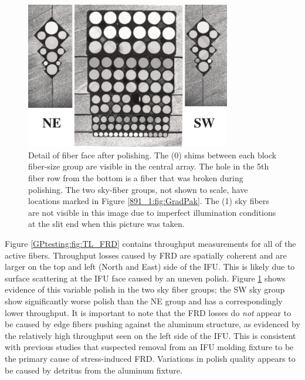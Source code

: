 \begin{figure}
  \centering
  \includegraphics[width=0.8\textwidth]{Appendix/figs/gradpak_facefig.pdf}
  \caption[\GP face and polishing
  detail]{\label{GPtesting:fig:gradpak_face}\fixspacing Detail of \GP
    fiber face
    after polishing. The  (0) shims between each
    block fiber-size group are visible in the central array. The hole
    in the 5th fiber row from the bottom is a fiber that was broken
    during polishing. The two sky-fiber groups, not shown to scale,
    have locations marked in Figure \ref{891_1:fig:GradPak}.  The
     (1) sky fibers are not visible in this image
    due to imperfect illumination conditions at the slit end when this
    picture was taken.}
\end{figure}

Figure \ref{GPtesting:fig:TL_FRD} contains throughput measurements for all of
the active \GP fibers. Throughput losses caused by FRD are spatially
coherent and are larger on the top and left (North and East) side of
the IFU. This is likely due to surface scattering at the IFU face
\citep{Eigenbrot12} caused by an uneven polish. Figure
\ref{GPtesting:fig:gradpak_face} shows evidence of this variable polish in the
two sky fiber groups; the SW sky group show significantly worse polish
than the NE group and has a correspondingly lower throughput. It is
important to note that the FRD losses do \emph{not} appear to be
caused by edge fibers pushing against the aluminum structure, as
evidenced by the relatively high throughput seen on the left side of
the IFU. This is consistent with previous studies \citep{Bershady04}
that suspected removal from an IFU molding fixture to be the primary
cause of stress-induced FRD. Variations in polish quality appears to
be caused by detritus from the aluminum fixture.

